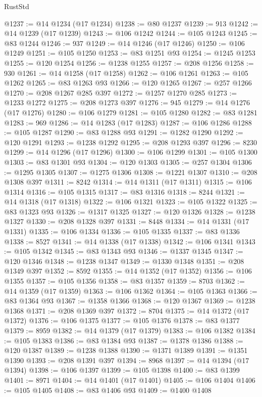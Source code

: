 \begin{lexlean}{RustStd}
\begin{coremodule}
@1237 := @14 @1234 (@17 @1234)
@1238 := @80 @1237
@1239 := 913
@1242 := @14 @1239 (@17 @1239)
@1243 := @106 @1242
@1244 := @105 @1243
@1245 := @83 @1244
@1246 := 937
@1249 := @14 @1246 (@17 @1246)
@1250 := @106 @1249
@1251 := @105 @1250
@1253 := @83 @1251 @93
@1254 := @1245 @1253
@1255 := @120 @1254
@1256 := @1238 @1255
@1257 := @208 @1256
@1258 := 930
@1261 := @14 @1258 (@17 @1258)
@1262 := @106 @1261
@1263 := @105 @1262
@1265 := @83 @1263 @93
@1266 := @120 @1265
@1267 := @257 @1266
@1270 := @208 @1267 @285 @397
@1272 := @1257 @1270 @285
@1273 := @1233 @1272
@1275 := @208 @1273 @397
@1276 := 945
@1279 := @14 @1276 (@17 @1276)
@1280 := @106 @1279
@1281 := @105 @1280
@1282 := @83 @1281
@1283 := 969
@1286 := @14 @1283 (@17 @1283)
@1287 := @106 @1286
@1288 := @105 @1287
@1290 := @83 @1288 @93
@1291 := @1282 @1290
@1292 := @120 @1291
@1293 := @1238 @1292
@1295 := @208 @1293 @397
@1296 := 8230
@1299 := @14 @1296 (@17 @1296)
@1300 := @106 @1299
@1301 := @105 @1300
@1303 := @83 @1301 @93
@1304 := @120 @1303
@1305 := @257 @1304
@1306 := @1295 @1305
@1307 := @1275 @1306
@1308 := @1221 @1307
@1310 := @208 @1308 @397
@1311 := 8242
@1314 := @14 @1311 (@17 @1311)
@1315 := @106 @1314
@1316 := @105 @1315
@1317 := @83 @1316
@1318 := 8244
@1321 := @14 @1318 (@17 @1318)
@1322 := @106 @1321
@1323 := @105 @1322
@1325 := @83 @1323 @93
@1326 := @1317 @1325
@1327 := @120 @1326
@1328 := @1238 @1327
@1330 := @208 @1328 @397
@1331 := 8448
@1334 := @14 @1331 (@17 @1331)
@1335 := @106 @1334
@1336 := @105 @1335
@1337 := @83 @1336
@1338 := 8527
@1341 := @14 @1338 (@17 @1338)
@1342 := @106 @1341
@1343 := @105 @1342
@1345 := @83 @1343 @93
@1346 := @1337 @1345
@1347 := @120 @1346
@1348 := @1238 @1347
@1349 := @1330 @1348
@1351 := @208 @1349 @397
@1352 := 8592
@1355 := @14 @1352 (@17 @1352)
@1356 := @106 @1355
@1357 := @105 @1356
@1358 := @83 @1357
@1359 := 8703
@1362 := @14 @1359 (@17 @1359)
@1363 := @106 @1362
@1364 := @105 @1363
@1366 := @83 @1364 @93
@1367 := @1358 @1366
@1368 := @120 @1367
@1369 := @1238 @1368
@1371 := @208 @1369 @397
@1372 := 8704
@1375 := @14 @1372 (@17 @1372)
@1376 := @106 @1375
@1377 := @105 @1376
@1378 := @83 @1377
@1379 := 8959
@1382 := @14 @1379 (@17 @1379)
@1383 := @106 @1382
@1384 := @105 @1383
@1386 := @83 @1384 @93
@1387 := @1378 @1386
@1388 := @120 @1387
@1389 := @1238 @1388
@1390 := @1371 @1389
@1391 := @1351 @1390
@1393 := @208 @1391 @397
@1394 := 8968
@1397 := @14 @1394 (@17 @1394)
@1398 := @106 @1397
@1399 := @105 @1398
@1400 := @83 @1399
@1401 := 8971
@1404 := @14 @1401 (@17 @1401)
@1405 := @106 @1404
@1406 := @105 @1405
@1408 := @83 @1406 @93
@1409 := @1400 @1408

\end{coremodule}
\end{lexlean}
